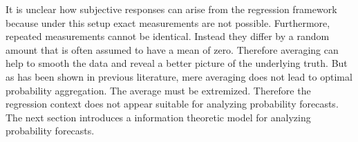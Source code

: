 \documentclass[11pt,twoside]{article}
\begin{document}
It is unclear how subjective responses can arise from the regression framework because under this setup exact measurements are not possible. Furthermore, repeated measurements cannot be identical. Instead they differ by a random amount that is often assumed to have a mean of zero. Therefore averaging can help to smooth the data and reveal a better picture of the underlying truth. But as has been shown in previous literature, mere averaging does not lead to optimal probability aggregation. The average must be extremized. Therefore the regression context does not appear suitable for analyzing probability forecasts. The next section introduces a information theoretic model for analyzing probability forecasts. 


%
%
%
\end{document}
